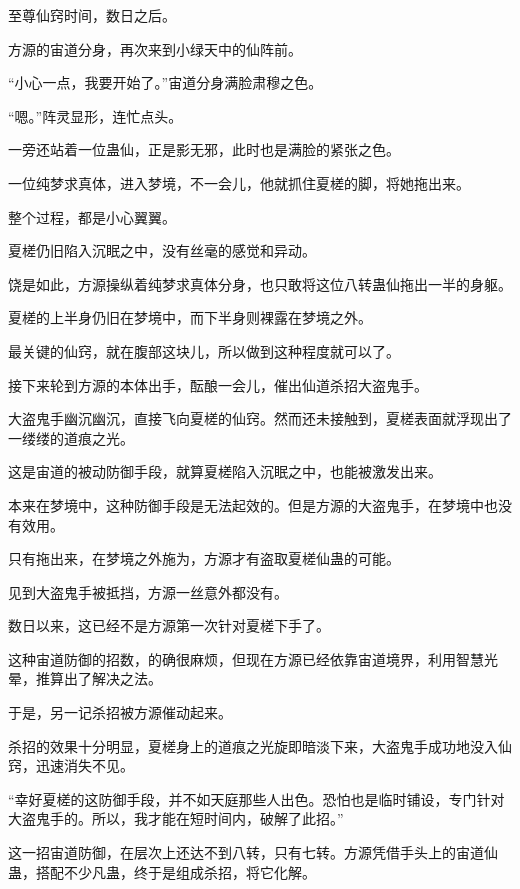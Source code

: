 
\begin{this_body}

至尊仙窍时间，数日之后。

方源的宙道分身，再次来到小绿天中的仙阵前。

“小心一点，我要开始了。”宙道分身满脸肃穆之色。

“嗯。”阵灵显形，连忙点头。

一旁还站着一位蛊仙，正是影无邪，此时也是满脸的紧张之色。

一位纯梦求真体，进入梦境，不一会儿，他就抓住夏槎的脚，将她拖出来。

整个过程，都是小心翼翼。

夏槎仍旧陷入沉眠之中，没有丝毫的感觉和异动。

饶是如此，方源操纵着纯梦求真体分身，也只敢将这位八转蛊仙拖出一半的身躯。

夏槎的上半身仍旧在梦境中，而下半身则裸露在梦境之外。

最关键的仙窍，就在腹部这块儿，所以做到这种程度就可以了。

接下来轮到方源的本体出手，酝酿一会儿，催出仙道杀招大盗鬼手。

大盗鬼手幽沉幽沉，直接飞向夏槎的仙窍。然而还未接触到，夏槎表面就浮现出了一缕缕的道痕之光。

这是宙道的被动防御手段，就算夏槎陷入沉眠之中，也能被激发出来。

本来在梦境中，这种防御手段是无法起效的。但是方源的大盗鬼手，在梦境中也没有效用。

只有拖出来，在梦境之外施为，方源才有盗取夏槎仙蛊的可能。

见到大盗鬼手被抵挡，方源一丝意外都没有。

数日以来，这已经不是方源第一次针对夏槎下手了。

这种宙道防御的招数，的确很麻烦，但现在方源已经依靠宙道境界，利用智慧光晕，推算出了解决之法。

于是，另一记杀招被方源催动起来。

杀招的效果十分明显，夏槎身上的道痕之光旋即暗淡下来，大盗鬼手成功地没入仙窍，迅速消失不见。

“幸好夏槎的这防御手段，并不如天庭那些人出色。恐怕也是临时铺设，专门针对大盗鬼手的。所以，我才能在短时间内，破解了此招。”

这一招宙道防御，在层次上还达不到八转，只有七转。方源凭借手头上的宙道仙蛊，搭配不少凡蛊，终于是组成杀招，将它化解。


\end{this_body}
